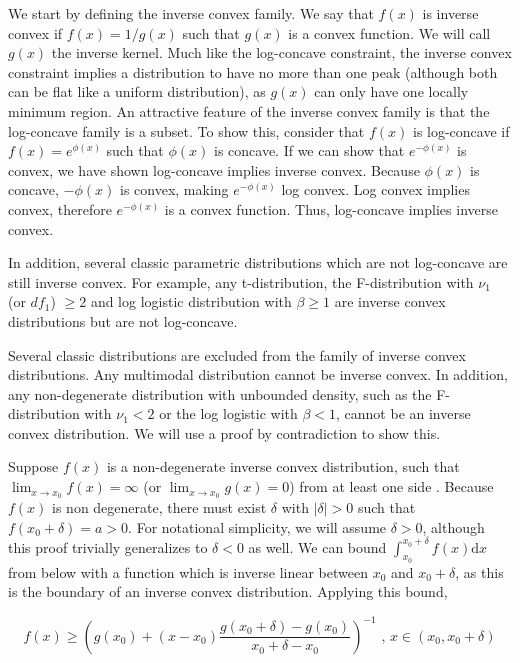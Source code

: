 \documentclass[11pt]{article}
\numberwithin{equation}{section}
\begin{document}
	We start by defining the inverse convex family. We say that $f(x)$ is inverse convex if $f(x) = 1/g(x)$ such that $g(x)$ is a convex function. We will call $g(x)$ the inverse kernel.  Much like the log-concave constraint, the inverse convex constraint implies a distribution to have no more than one peak (although both can be flat like a uniform distribution), as $g(x)$ can only have one locally minimum region. An attractive feature of the inverse convex family is that the log-concave family is a subset. To show this, consider that $f(x)$ is log-concave if $f(x) = e^{\phi(x)}$ such that $\phi(x)$ is concave. If we can show that $e^{-\phi(x)}$ is convex, we have shown log-concave implies inverse convex. Because $\phi(x)$ is concave, $-\phi(x)$ is convex, making $e^{-\phi(x)}$ log convex. Log convex implies convex, therefore $e^{-\phi(x)}$ is a convex function.  Thus, log-concave implies inverse convex. 
	
		
	In addition, several classic parametric distributions which are not log-concave are still inverse convex. For example, any t-distribution, the F-distribution with $\nu_1$ (or $df_1$) $\geq 2$ and  log logistic distribution with $\beta \geq 1$ are inverse convex distributions but are not log-concave. 

	Several classic distributions are excluded from the family of inverse convex distributions. Any multimodal distribution cannot be inverse convex. In addition, any non-degenerate distribution with unbounded density, such as the F-distribution with $\nu_1 < 2$ or the log logistic with $\beta < 1$, cannot be an inverse convex distribution. We will use a proof by contradiction to show this. 
	
	Suppose $f(x)$ is a non-degenerate inverse convex distribution, such that $\displaystyle \lim_{x \rightarrow x_0} f(x) = \infty$ (or $\displaystyle \lim_{x \rightarrow x_0} g(x) = 0$) from at least one side . Because $f(x)$ is non degenerate, there must exist $\delta$ with $| \delta | > 0$ such that $f(x_0 + \delta) = a > 0$. For notational simplicity, we will assume $\delta > 0$, although this proof trivially generalizes to $\delta < 0$ as well. We can bound $\displaystyle \int_{x_0}^{x_0 + \delta} f(x) \mathrm{d}x$ from below with a function which is inverse linear between $x_0$ and $x_0 +\delta$, as this is the boundary of an inverse convex distribution. Applying this bound, 
	
	\[
	f(x) \geq \left( g(x_0) + (x - x_0) \frac{g(x_0 + \delta) - g(x_0) } {x_0 + \delta - x_0} \right)^{-1} \text{ , } x \in (x_0, x_0 + \delta)
	\]
	
\end{document}
